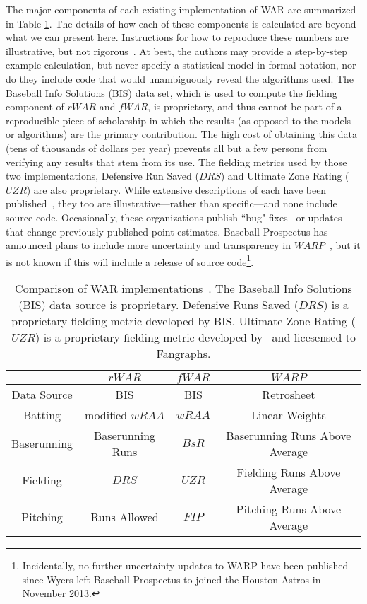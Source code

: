 \documentclass[letterpaper,titlepage]{article}
\begin{document}
The major components of each existing implementation of WAR are summarized in Table \ref{tab:compare}. The details of how each of these components is calculated are beyond what we can present here. Instructions for how to reproduce these numbers are illustrative, but not rigorous~\citep{fangraphs, bbref, rwar, compare, tango, uzr, wyers2013rw}.  At best, the authors may provide a step-by-step example calculation, but never specify a statistical model in formal notation, nor do they include code that would unambiguously reveal the algorithms used. The Baseball Info Solutions (BIS) data set, which is used to compute the fielding component of $rWAR$ and $fWAR$, is proprietary, and thus cannot be part of a reproducible piece of scholarship in which the results (as opposed to the models or algorithms) are the primary contribution. The high cost of obtaining this data (tens of thousands of dollars per year) prevents all but a few persons from verifying any results that stem from its use. The fielding metrics used by those two implementations, Defensive Run Saved ($DRS$) and Ultimate Zone Rating ($UZR$) are also proprietary. While extensive descriptions of each have been published~\citep{drs,uzr}, they too are illustrative---rather than specific---and none include source code. Occasionally, these organizations publish ``bug" fixes~\citep{hamrahi} or updates~\citep{appelmanuzr} that change previously published point estimates. Baseball Prospectus has announced plans to include more uncertainty and transparency in $WARP$~\citep{wyers2013rw}, but it is not known if this will include a release of source code\footnote{Incidentally, no further uncertainty updates to WARP have been published since Wyers left Baseball Prospectus to joined the Houston Astros in November 2013.}. 
	
	\begin{table}[ht!]
		\centering
		\begin{tabular}{c|c|c|c}
		 & $rWAR$ & $fWAR$ & $WARP$ \\
		 \hline
		 Data Source & BIS & BIS & Retrosheet \\
		 Batting 		& modified $wRAA$ & $wRAA$ & Linear Weights \\
		 Baserunning & Baserunning Runs & $BsR$ & Baserunning Runs Above Average \\
		 Fielding & $DRS$ & $UZR$ & Fielding Runs Above Average \\
		 Pitching & Runs Allowed & $FIP$ & Pitching Runs Above Average \\
		 \hline
		\end{tabular}
		\caption{Comparison of WAR implementations~\cite{compare}. The Baseball Info Solutions (BIS) data source is proprietary. Defensive Runs Saved ($DRS$) is a proprietary fielding metric developed by BIS. Ultimate Zone Rating ($UZR$) is a proprietary fielding metric developed by~\cite{uzr} and licesensed to Fangraphs.}
		\label{tab:compare}
	\end{table}
	
\end{document}
